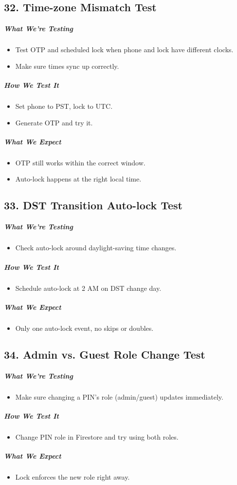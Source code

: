 \subsection*{32. Time-zone Mismatch Test}
\subparagraph{What We’re Testing}
\begin{itemize}
    \item Test OTP and scheduled lock when phone and lock have different clocks.
    \item Make sure times sync up correctly.
\end{itemize}
\subparagraph{How We Test It}
\begin{itemize}
    \item Set phone to PST, lock to UTC.
    \item Generate OTP and try it.
\end{itemize}
\subparagraph{What We Expect}
\begin{itemize}
    \item OTP still works within the correct window.
    \item Auto-lock happens at the right local time.
\end{itemize}

\subsection*{33. DST Transition Auto-lock Test}
\subparagraph{What We’re Testing}
\begin{itemize}
    \item Check auto-lock around daylight-saving time changes.
\end{itemize}
\subparagraph{How We Test It}
\begin{itemize}
    \item Schedule auto-lock at 2 AM on DST change day.
\end{itemize}
\subparagraph{What We Expect}
\begin{itemize}
    \item Only one auto-lock event, no skips or doubles.
\end{itemize}

\subsection*{34. Admin vs. Guest Role Change Test}
\subparagraph{What We’re Testing}
\begin{itemize}
    \item Make sure changing a PIN’s role (admin/guest) updates immediately.
\end{itemize}
\subparagraph{How We Test It}
\begin{itemize}
    \item Change PIN role in Firestore and try using both roles.
\end{itemize}
\subparagraph{What We Expect}
\begin{itemize}
    \item Lock enforces the new role right away.
\end{itemize}


